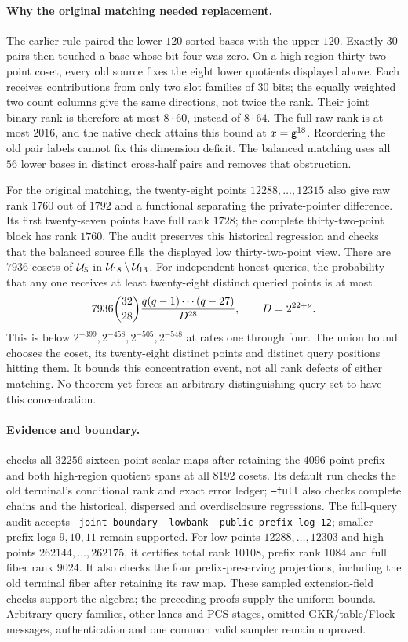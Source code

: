 \paragraph{Why the original matching needed replacement.} The earlier rule paired the lower $120$ sorted bases with the upper $120$. Exactly $30$ pairs then touched a base whose bit four was zero. On a high-region thirty-two-point coset, every old source fixes the eight lower quotients displayed above. Each receives contributions from only two slot families of $30$ bits; the equally weighted two count columns give the same directions, not twice the rank. Their joint binary rank is therefore at most $8\cdot60$, instead of $8\cdot64$. The full raw rank is at most $2016$, and the native check attains this bound at $x=\mathsf{g}^{18}$. Reordering the old pair labels cannot fix this dimension deficit. The balanced matching uses all $56$ lower bases in distinct cross-half pairs and removes that obstruction.

For the original matching, the twenty-eight points $12288,\ldots,12315$ also give raw rank $1760$ out of $1792$ and a functional separating the private-pointer difference. Its first twenty-seven points have full rank $1728$; the complete thirty-two-point block has rank $1760$. The audit preserves this historical regression and checks that the balanced source fills the displayed low thirty-two-point view. There are $7936$ cosets of $\mathcal{U}_5$ in $\mathcal{U}_{18}\setminus\mathcal{U}_{13}$. For independent honest queries, the probability that any one receives at least twenty-eight distinct queried points is at most
\[
 7936\binom{32}{28}\frac{q(q-1)\cdots(q-27)}{D^{28}},
 \qquad D=2^{22+\nu}.
\]
This is below $2^{-399},2^{-458},2^{-505},2^{-548}$ at rates one through four. The union bound chooses the coset, its twenty-eight distinct points and distinct query positions hitting them. It bounds this concentration event, not all rank defects of either matching. No theorem yet forces an arbitrary distinguishing query set to have this concentration.

\paragraph{Evidence and boundary.}  checks all $32256$ sixteen-point scalar maps after retaining the $4096$-point prefix and both high-region quotient spans at all $8192$ cosets. Its default run checks the old terminal's conditional rank and exact error ledger; \texttt{--full} also checks complete chains and the historical, dispersed and overdisclosure regressions. The full-query audit accepts \texttt{--joint-boundary --lowbank --public-prefix-log 12}; smaller prefix logs $9,10,11$ remain supported. For low points $12288,\ldots,12303$ and high points $262144,\ldots,262175$, it certifies total rank $10108$, prefix rank $1084$ and full fiber rank $9024$. It also checks the four prefix-preserving projections, including the old terminal fiber after retaining its raw map. These sampled extension-field checks support the algebra; the preceding proofs supply the uniform bounds. Arbitrary query families, other lanes and PCS stages, omitted GKR/table/Flock messages, authentication and one common valid sampler remain unproved.
